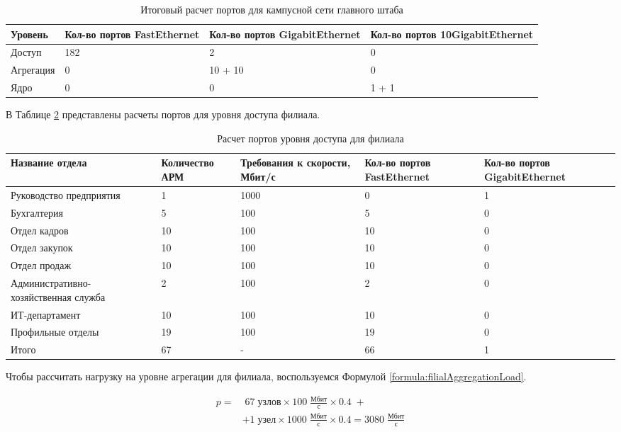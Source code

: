 \documentclass[14pt, a4paper]{extarticle}
\numberwithin{equation}{section}
\begin{document}
\begin{table}[H]
\centering
\small
\caption{Итоговый расчет портов для кампусной сети главного штаба}
\begin{tabular}{|m{2cm}|m{4cm}|m{3cm}|m{3.5cm}|}
\hline
\textbf{Уровень} & \textbf{Кол-во портов FastEthernet} & \textbf{Кол-во портов GigabitEthernet} & \textbf{Кол-во портов 10GigabitEthernet} \\
\hline
Доступ & 182 & 2 & 0 \\
\hline
Агрегация & 0 & 10 + 10 & 0 \\
\hline
Ядро & 0 & 0 & 1 + 1 \\
\hline
\end{tabular}
\label{table:mainDepCampusNet}
\end{table}


        

В Таблице \ref{table:filialAccessLevel} представлены расчеты портов для уровня доступа 
филиала.

\begin{table}[H]
\centering
\small
\caption{Расчет портов уровня доступа для филиала}
\begin{tabular}{|m{4cm}|m{2.5cm}|m{2.5cm}|m{2.5cm}|m{3cm}|}
\hline
\textbf{Название отдела} & \textbf{Количество АРМ} & \textbf{Требования к скорости, Мбит/с} & \textbf{Кол-во портов FastEthernet} & \textbf{Кол-во портов GigabitEthernet} \\
\hline
Руководство предприятия & 1 & 1000 & 0 & 1 \\
\hline
Бухгалтерия & 5 & 100 & 5 & 0 \\
\hline
Отдел кадров & 10 & 100 & 10 & 0 \\
\hline
Отдел закупок & 10 & 100 & 10 & 0 \\
\hline
Отдел продаж & 10 & 100 & 10 & 0 \\
\hline
Административно-хозяйственная служба & 2 & 100 & 2 & 0 \\
\hline
ИТ-департамент & 10 & 100 & 10 & 0 \\
\hline
Профильные отделы & 19 & 100 & 19 & 0 \\
\hline
Итого & 67 & - & 66 & 1 \\
\hline
\end{tabular}
\label{table:filialAccessLevel}
\end{table}

Чтобы рассчитать нагрузку на уровне агрегации для 
филиала, воспользуемся Формулой \ref{formula:filialAggregationLoad}.

\begin{equation}
\begin{aligned}
p = & \; 67 \; \text{узлов} \times 100\;\frac{\text{Мбит}}{\text{с}} \times 0.4 \; + \\
& + 1 \; \text{узел} \times 1000\;\frac{\text{Мбит}}{\text{с}} \times 0.4 = 3080\;\frac{\text{Мбит}}{\text{с}}
\end{aligned}
\label{formula:filialAggregationLoad}
\end{equation}
\end{document}
